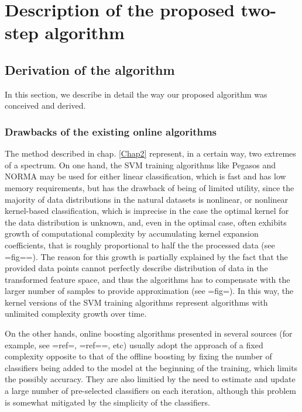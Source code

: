 
\chapter{Description of the proposed two-step algorithm} %
\section{Derivation of the algorithm}
In this section, we describe in detail the way our proposed algorithm was conceived and derived. 
\subsection{Drawbacks of the existing online algorithms}
The method described in chap. \ref{Chap2} represent, in a certain way, two extremes of a spectrum. On one hand, the SVM training algorithms like Pegasos and NORMA may be used for either linear classification, which is fast and has low memory requirements, but has the drawback of being of limited utility, since the majority of data distributions in the natural datasets is nonlinear, or nonlinear kernel-based classification, which is imprecise in the case the optimal kernel for the data distribution is unknown, and, even in the optimal case, often exhibits growth of computational complexity by accumulating kernel expansion coefficients, that is roughly proportional to half the the processed data (see {{=fig==}}). The reason for this growth is partially explained by the fact that the provided data points cannot perfectly describe distribution of data in the transformed feature space, and thus the algorithms has to compensate with the larger number of samples to provide approximation (see {{=fig=}}). In this way, the kernel versions of the SVM training algorithms represent algorithms with unlimited complexity growth over time.

On the other hands, online boosting algorithms presented in several sources (for example, see {{=ref=}}, {{=ref==}}, etc) usually adopt the approach of a fixed complexity opposite to that of the offline boosting by fixing the number of classifiers being added to the model at the beginning of the training, which limits the possibly accuracy. They are also limitied by the need to estimate and update a large number of pre-selected classifiers on each iteration, although this problem is somewhat mitigated by the simplicity of the classifiers.

